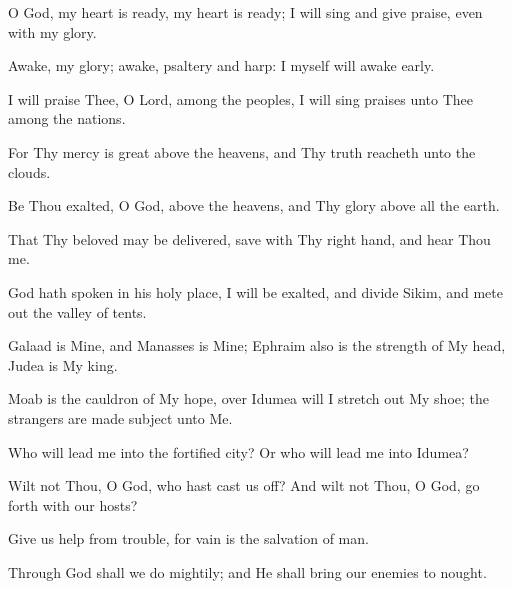 O God, my heart is ready, my heart is ready; I will sing and give praise, even with my glory.

Awake, my glory; awake, psaltery and harp: I myself will awake early.

I will praise Thee, O Lord, among the peoples, I will sing praises unto Thee among the nations.

For Thy mercy is great above the heavens, and Thy truth reacheth unto the clouds.

Be Thou exalted, O God, above the heavens, and Thy glory above all the earth.

That Thy beloved may be delivered, save with Thy right hand, and hear Thou me.

God hath spoken in his holy place, I will be exalted, and divide Sikim, and mete out the valley of tents.

Galaad is Mine, and Manasses is Mine; Ephraim also is the strength of My head, Judea is My king.

Moab is the cauldron of My hope, over Idumea will I stretch out My shoe; the strangers are made subject unto Me.

Who will lead me into the fortified city? Or who will lead me into Idumea?

Wilt not Thou, O God, who hast cast us off? And wilt not Thou, O God, go forth with our hosts?

Give us help from trouble, for vain is the salvation of man.

Through God shall we do mightily; and He shall bring our enemies to nought.

